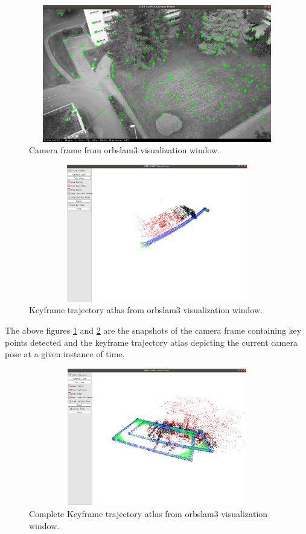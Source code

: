 \begin{figure}[h]
    \centering
    \includegraphics[height=6cm, width=12cm]{Images/camera_frame_orbslam3.png}
    \caption{Camera frame from orbslam3 visualization window.}
    \label{fig:cameraframe}
\end{figure}

\begin{figure}[h]
    \centering
    \includegraphics[height=6cm, width=12cm]{Images/trajectory_orbslam3.png}
    \caption{Keyframe trajectory atlas from orbslam3 visualization window.}
    \label{fig:kftrajatlas}
\end{figure}

The above figures \ref{fig:cameraframe} and \ref{fig:kftrajatlas} are the snapshots of the camera frame containing key points detected and the keyframe trajectory atlas depicting the current camera pose at a given instance of time. 

\begin{figure}[h]
    \centering
    \includegraphics[height=6cm, width=12cm]{Images/trajectory_final_orbslam3.png}
    \caption{Complete Keyframe trajectory atlas from orbslam3 visualization window.}
    \label{fig:kftrajatlascomplete}
\end{figure}

